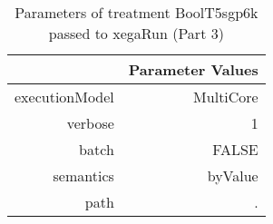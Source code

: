 \begin{table}[ht]
\centering
\begin{tabular}{rr}
  \hline
 & Parameter Values \\ 
  \hline
executionModel & MultiCore \\ 
  verbose & 1 \\ 
  batch & FALSE \\ 
  semantics & byValue \\ 
  path & . \\ 
   \hline
\end{tabular}
\caption{ Parameters of treatment BoolT5sgp6k passed to xegaRun
 (Part 3)} 
\end{table}
